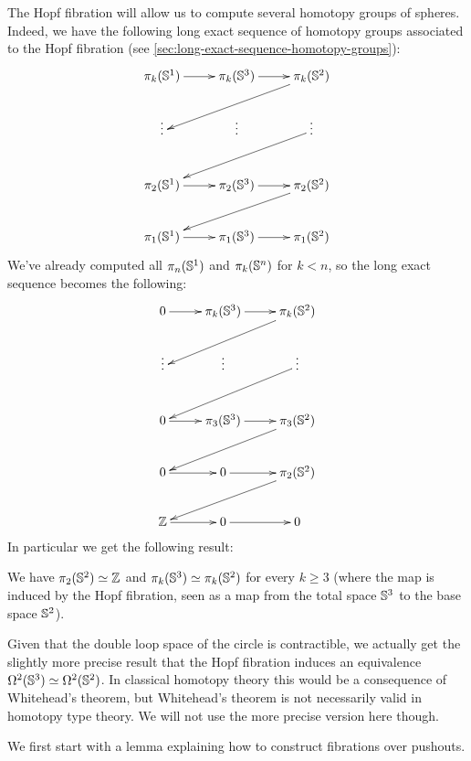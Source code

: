The Hopf fibration will allow us to compute several homotopy groups of
spheres. Indeed, we have the following long exact sequence of homotopy groups
associated to the Hopf fibration (see
\autoref{sec:long-exact-sequence-homotopy-groups}):
%
\[
\xymatrix{
  \pi_k(\Sn^1) \ar[r] & \pi_k(\Sn^3) \ar[r] & \pi_k(\Sn^2) \ar[lld] \\
  \vdots & \vdots & \vdots \ar[lld] \\
  \pi_2(\Sn^1) \ar[r] & \pi_2(\Sn^3) \ar[r] & \pi_2(\Sn^2) \ar[lld] \\
  \pi_1(\Sn^1) \ar[r] & \pi_1(\Sn^3) \ar[r] & \pi_1(\Sn^2)}
\]
%
We’ve already computed all $\pi_n(\mathbb{S}^1)$ and $\pi_k(\mathbb{S}^n)$ for $k<n$, so the
long exact sequence becomes the following:
%
\[
\xymatrix{
  0 \ar[r] & \pi_k(\Sn^3) \ar[r] & \pi_k(\Sn^2) \ar[lld] \\
  \vdots & \vdots & \vdots \ar[lld] \\
  0 \ar[r] & \pi_3(\Sn^3) \ar[r] & \pi_3(\Sn^2) \ar[lld] \\
  0 \ar[r] & 0 \ar[r] & \pi_2(\Sn^2) \ar[lld] \\
  \Z \ar[r] & 0 \ar[r] & 0}
\]
%
In particular we get the following result:

\begin{cor} \label{cor:pis2-hopf}
  We have $\pi_2(\mathbb{S}^2) \simeq \mathbb{Z}$ and $\pi_k(\mathbb{S}^3) \simeq \pi_k(\mathbb{S}^2)$ for
  every $k\ge3$ (where the map is induced by the Hopf fibration, seen as a map
  from the total space $\mathbb{S}^3$ to the base space $\mathbb{S}^2$).
\end{cor}

Given that the double loop space of the circle is contractible, we actually get
the slightly more precise result that the Hopf fibration induces an equivalence
$\Omega^2(\mathbb{S}^3) \simeq \Omega^2(\mathbb{S}^2)$. In classical homotopy theory this
would be a consequence of Whitehead's theorem, but Whitehead's theorem is not
necessarily valid in homotopy type theory. We will not use the more precise
version here though.

We first start with a lemma explaining how to construct fibrations over
pushouts.

